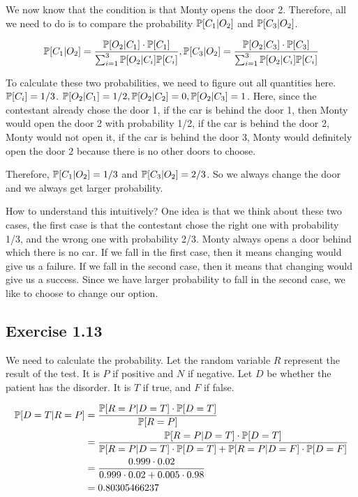 We now know that the condition is that Monty opens the door 2. Therefore, all we need to do is to compare
the probability $\P[C_1 | O_2]$ and $\P[C_3 | O_2]$.

\begin{equation*}
\P[C_1 | O_2] = \frac{\P[O_2 | C_1] \cdot \P[C_1]}{\sum_{i=1}^{3} \P[O_2 | C_i]\P[C_i]},
\P[C_3 | O_2] = \frac{\P[O_2 | C_3] \cdot \P[C_3]}{\sum_{i=1}^{3} \P[O_2 | C_i]\P[C_i]}
\end{equation*}

To calculate these two probabilities, we need to figure out all quantities here. $\P[C_i] = 1/3$.
$\P[O_2 | C_1] = 1/2, \P[O_2 | C_2] = 0, \P[O_2 | C_3] = 1$. Here, since the contestant
already chose the door 1, if the car is behind the door 1, then Monty would open the door 2 with probability 1/2, if the
car is behind the door 2, Monty would not open it, if the car is behind the door 3, Monty would definitely open
the door 2 because there is no other doors to choose.

Therefore, $\P[C_1 | O_2] = 1/3$ and $\P[C_3 | O_2] = 2/3$. So we always change the door and we always get larger
probability. 

How to understand this intuitively? One idea is that we think about these two cases, the first case is that the contestant chose
the right one with probability 1/3, and the wrong one with probability 2/3. Monty always opens a door behind which there is no car.
If we fall in the first case, then it means changing would give us a failure. If we fall in the second case, then it means that
changing would give us a success. Since we have larger probability to fall in the second case, we like to choose to change our
option.

\subsection*{Exercise 1.13}

We need to calculate the probability. Let the random variable $R$ represent the result of the test. It is $P$ if positive
and $N$ if negative. Let $D$ be whether the patient has the disorder. It is $T$ if true, and $F$ if false.

\begin{equation*}
\begin{split}
\P[D = T | R = P] & = \frac{\P[R =P | D = T] \cdot \P[D = T]}{\P[R = P]} \\
& = \frac{\P[R = P | D = T] \cdot \P[D = T]}{\P[R = P | D = T] \cdot \P[D = T]
	+ \P[R = P | D = F] \cdot \P[D = F]} \\
& = \frac{0.999 \cdot 0.02}{0.999 \cdot 0.02 + 0.005 \cdot 0.98} \\
& = 0.80305466237
\end{split}
\end{equation*}

